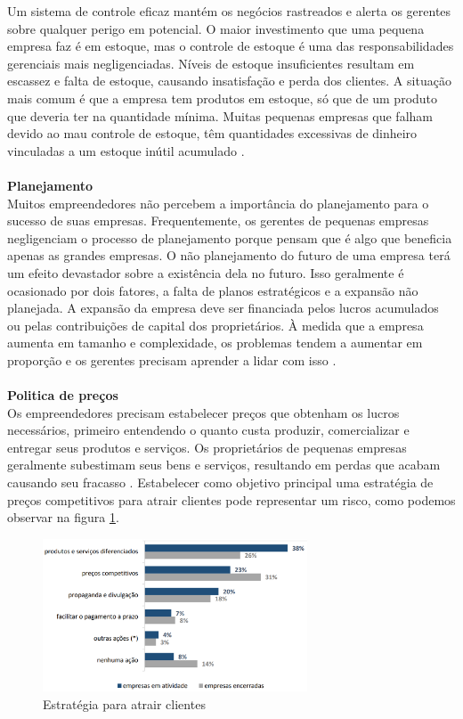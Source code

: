 Um sistema de controle eficaz mantém os negócios rastreados e alerta os gerentes sobre qualquer perigo em potencial. O maior investimento que uma pequena empresa faz é em estoque, mas o controle de estoque é uma das responsabilidades gerenciais mais negligenciadas. Níveis de estoque insuficientes resultam em escassez e falta de estoque, causando insatisfação e perda dos clientes. A situação mais comum é que a empresa tem produtos em estoque, só que de um produto que deveria ter na quantidade mínima. Muitas pequenas empresas que falham devido ao mau controle de estoque, têm quantidades excessivas de dinheiro vinculadas a um estoque inútil acumulado \cite{palukukazimoto2009}.
\\
\\
\textbf{Planejamento}
\\

Muitos empreendedores não percebem a importância do planejamento para o sucesso de suas empresas. Frequentemente, os gerentes de pequenas empresas negligenciam o processo de planejamento porque pensam que é algo que beneficia apenas as grandes empresas. O não planejamento do futuro de uma empresa terá um efeito devastador sobre a existência dela no futuro. Isso geralmente é ocasionado por dois fatores, a falta de planos estratégicos e a expansão não planejada. A expansão da empresa deve ser financiada pelos lucros acumulados ou pelas contribuições de capital dos proprietários. À medida que a empresa aumenta em tamanho e complexidade, os problemas tendem a aumentar em proporção e os gerentes precisam aprender a lidar com isso \cite{palukukazimoto2009}.
\\
\\
\textbf{Politica de preços}
\\

Os empreendedores precisam estabelecer preços que obtenham os lucros necessários, primeiro entendendo o quanto custa produzir, comercializar e entregar seus produtos e serviços. Os proprietários de pequenas empresas geralmente subestimam seus bens e serviços, resultando em perdas que acabam causando seu fracasso \cite{thandekaruthkunene2008}. Estabelecer como objetivo principal uma estratégia de preços competitivos para atrair clientes pode representar um risco, como podemos observar na figura \ref{fig:precos}.

\begin{figure}[hbt!]
 \centering
  \includegraphics[width=0.70\textwidth]{./fig/precos}
 \caption{Estratégia para atrair clientes \cite{sebraesp}}
 \label{fig:precos}
\end{figure}

